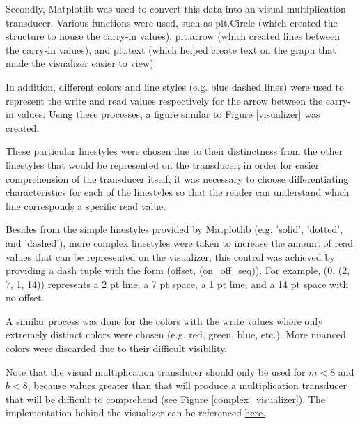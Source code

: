 \documentclass{article}
\begin{document}
Secondly, Matplotlib was used to convert this data into an visual multiplication transducer. Various functions were used, such as plt.Circle (which created the structure to house the carry-in values), plt.arrow (which created lines between the carry-in values), and plt.text (which helped create text on the graph that made the visualizer easier to view). \vspace{\baselineskip}

In addition, different colors and line styles (e.g. blue dashed lines) were used to represent the write and read values respectively for the arrow between the carry-in values. Using these processes, a figure similar to Figure \ref{visualizer} was created. \vspace{\baselineskip}

These particular linestyles were chosen due to their distinctness from the other linestyles that would be represented on the transducer; in order for easier comprehension of the transducer itself, it was necessary to choose differentiating characteristics for each of the linestyles so that the reader can understand which line corresponds a specific read value. \vspace{\baselineskip}

Besides from the simple linestyles provided by Matplotlib (e.g. 'solid', 'dotted', and 'dashed'), more complex linestyles were taken to increase the amount of read values that can be represented on the visualizer; this control was achieved by providing a dash tuple with the form (offset, (on\_off\_seq)). For example, (0, (2, 7, 1, 14)) represents a 2 pt line, a 7 pt space, a 1 pt line, and a 14 pt space with no offset. \vspace{\baselineskip}

A similar process was done for the colors with the write values where only extremely distinct colors were chosen (e.g. red, green, blue, etc.). More nuanced colors were discarded due to their difficult visibility. \vspace{\baselineskip}

Note that the visual multiplication transducer should only be used for $m < 8$ and $b < 8$, because values greater than that will produce a multiplication transducer that will be difficult to comprehend (see Figure \ref{complex_visualizer}). The implementation behind the visualizer can be referenced \href{https://github.com/karthikm15/Multiplication-Transducer/blob/main/Matplotlib\%20Visualization.ipynb}{\color{blue}here.}
\end{document}
